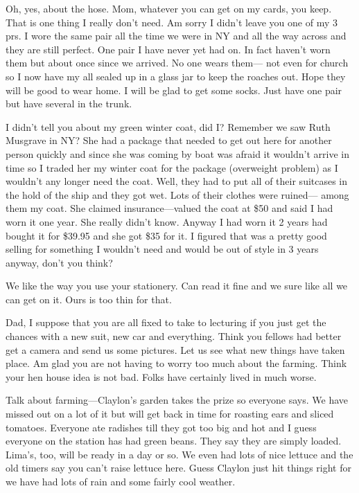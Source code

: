 \documentclass[
]{book}
\begin{document}
Oh, yes, about the hose. Mom, whatever you can get on my cards, you keep. That is one thing I really don't need. Am sorry I didn't leave you one of my 3 prs. I wore the same pair all the time we were in NY and all the way across and they are still perfect. One pair I have never yet had on. In fact haven't worn them but about once since we arrived. No one wears them--- not even for church so I now have my all sealed up in a glass jar to keep the roaches out. Hope they will be good to wear home. I will be glad to get some socks. Just have one pair but have several in the trunk.

I didn't tell you about my green winter coat, did I? Remember we saw Ruth Musgrave in NY? She had a package that needed to get out here for another person quickly and since she was coming by boat was afraid it wouldn't arrive in time so I traded her my winter coat for the package (overweight problem) as I wouldn't any longer need the coat. Well, they had to put all of their suitcases in the hold of the ship and they got wet. Lots of their clothes were ruined--- among them my coat. She claimed insurance---valued the coat at \$50 and said I had worn it one year. She really didn't know. Anyway I had worn it 2 years had bought it for \$39.95 and she got \$35 for it. I figured that was a pretty good selling for something I wouldn't need and would be out of style in 3 years anyway, don't you think?

We like the way you use your stationery. Can read it fine and we sure like all we can get on it. Ours is too thin for that.

Dad, I suppose that you are all fixed to take to lecturing if you just get the chances with a new suit, new car and everything. Think you fellows had better get a camera and send us some pictures. Let us see what new things have taken place. Am glad you are not having to worry too much about the farming. Think your hen house idea is not bad. Folks have certainly lived in much worse.

Talk about farming---Claylon's garden takes the prize so everyone says. We have missed out on a lot of it but will get back in time for roasting ears and sliced tomatoes. Everyone ate radishes till they got too big and hot and I guess everyone on the station has had green beans. They say they are simply loaded. Lima's, too, will be ready in a day or so. We even had lots of nice lettuce and the old timers say you can't raise lettuce here. Guess Claylon just hit things right for we have had lots of rain and some fairly cool weather.
\end{document}

